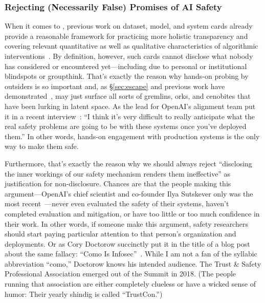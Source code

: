 \subsubsection{Rejecting (Necessarily False) Promises of AI Safety}

When it comes to , previous work on dataset, model, and system cards already
provide a reasonable framework for practicing more holistic transparency and
covering relevant quantitative as well as qualitative characteristics of
algorithmic
interventions~\cite{GebruMorgensternea2021,MitchellWuea2019,ProcopeCheemaea2022}.
By definition, however, such cards cannot disclose what nobody has considered or
encountered yet---including due to personal or institutional blindspots or
groupthink. That's exactly the reason why hands-on probing by outsiders is so
important and, as \S\ref{sec:escape} and previous work have
demonstrated~\cite{BirhanePrabhuea2021,CarliniHayesea2023}, may just surface all
sorts of gremlins, orks, and cenobites that have been lurking in latent space.
As the lead for OpenAI's alignment team put it in a recent
interview~\cite{Heaven2023}: ``I think it's very difficult to really anticipate
what the real safety problems are going to be with these systems once you've
deployed them.'' In other words, hands-on engagement with production systems is
the only way to make them safe.

Furthermore, that's exactly the reason why we should always reject ``disclosing
the inner workings of our safety mechanism renders them ineffective'' as
justification for non-disclosure. Chances are that the people making this
argument---OpenAI's chief scientist and co-founder Ilya Sutskever only was the
most recent~\cite{Vincent2023a}---never even evaluated the safety of their
systems, haven't completed evaluation and mitigation, or have too little or too
much confidence in their work. In other words, if someone make this argument,
safety researchers should start paying particular attention to that person's
organization and  deployments. Or as Cory Doctorow succinctly put it in the
title of a blog post about the same fallacy: ``Como Is
Infosec''~\cite{Doctorow2022}. While I am not a fan of the syllabic abbreviation
``como,'' Doctorow knows his intended audience. The Trust \& Safety Professional
Association emerged out of the  Summit in 2018. (The people running that
association are either completely clueless or have a wicked sense of humor:
Their yearly shindig is called ``TrustCon.'')

